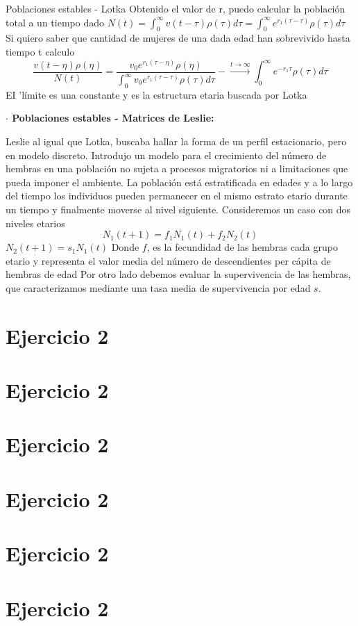 \documentclass[%
 reprint,
 amsmath,amssymb,
 aps,
]{revtex4-1}
\begin{document}
Poblaciones estables - Lotka
Obtenido el valor de r, puedo calcular la población total a un tiempo dado
$N(t)=\int_{0}^{\infty} v(t-\tau) \rho(\tau) d \tau=\int_{0}^{\infty} e^{r_{1}(\tau-\tau)} \rho(\tau) d \tau$
Si quiero saber que cantidad de mujeres de una dada edad han sobrevivido hasta tiempo t calculo
$$
\frac{v(t-\eta) \rho(\eta)}{N(t)}=\frac{v_{0} e^{r_{1}(\tau-\eta)} \rho(\eta)}{\int_{0}^{\infty} v_{0} e^{r_{1}(\tau-\tau)} \rho(\tau) d \tau}-\stackrel{t \rightarrow \infty}{\rightarrow} \int_{0}^{\infty} e^{-r_{1} \tau} \rho(\tau) d \tau
$$
EI 'límite es una constante y es la estructura etaria buscada por Lotka

\textbf{$\cdot$ Poblaciones estables - Matrices de Leslie:}


Leslie al igual que Lotka, buscaba hallar la forma de un perfil estacionario, pero en modelo discreto. Introdujo un modelo para el crecimiento del número de hembras en una población no sujeta a procesos migratorios ni a limitaciones que pueda imponer el ambiente. La población está estratificada en edades y a lo largo del tiempo los individuos pueden permanecer en el mismo estrato etario durante un tiempo y finalmente moverse al nivel siguiente. Consideremos un caso con dos niveles etarios
$$
N_{1}(t+1)=f_{1} N_{1}(t)+f_{2} N_{2}(t)
$$
$N_{2}(t+1)=s_{1} N_{1}(t)$
Donde $f$, es la fecundidad de las hembras cada grupo etario y representa el valor media del número de descendientes per cápita de hembras de edad Por otro lado debemos evaluar la supervivencia de las hembras, que caracterizamos mediante una tasa media de supervivencia por edad $s$.

\section{Ejercicio 2}
\section{Ejercicio 2}
\section{Ejercicio 2}
\section{Ejercicio 2}
\section{Ejercicio 2}
\section{Ejercicio 2}
\end{document}

